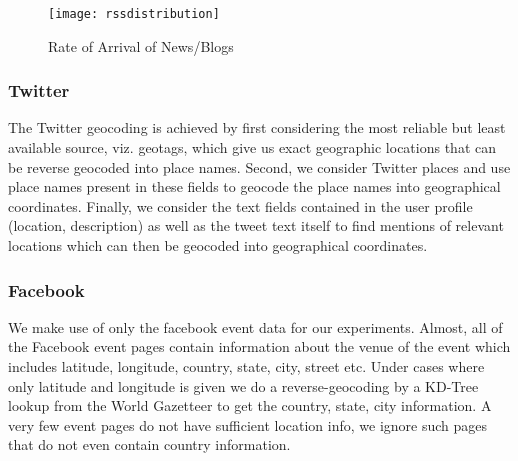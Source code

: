 \iffalse Most news articles and blog posts mention multiple locations, e.g.,
the location of reporting, the location of the incident, and locations corresponding
to the hometown of the newspaper. We developed a probabilistic reasoning
engine using probabilistic soft logic (PSL)
to infer the most likely city, state and country which is the main geographic focus the article.The PSL geocoder combines various types of evidence, such as named entities
such as locations, persons, and organizations identified by RLP, as
well as common names and aliases and populations of known
locations. These diverse types of evidence are used in weighted rules
that prioritize their influence on the PSL model's location
prediction. For example, extracted location tokens are strong
indicators of the content location of an article, while organization
and person names containing location names are weaker but still
informative signals; the rules corresponding to these evidence types
are weighted accordingly.

The methodology is similar to {\em Web-a-where: Geo-Tagging Web Content}.
\fi 

\begin{figure}
    \texttt{[image: rssdistribution]}
    \caption{Rate of Arrival of News/Blogs}
    \label{fig:rssdistribution}
\end{figure}

\subsubsection{Twitter}
The Twitter\cite{twitter} geocoding is achieved by first
considering the most reliable but least available source,
viz. geotags, which give us exact geographic locations that can be
reverse geocoded into place names.  Second, we consider Twitter places
and use place names present in these fields to geocode the place names
into geographical coordinates.  Finally, we consider the text fields
contained in the user profile (location, description) as well as the
tweet text itself to find mentions of relevant locations which can
then be geocoded into geographical coordinates.

\subsubsection{Facebook}
We make use of only the facebook event data for our experiments. Almost, all of the Facebook event pages contain information about the venue of the event which includes latitude, longitude, country, state, city, street etc. Under cases where only latitude and longitude is given we do a reverse-geocoding by a KD-Tree lookup\cite{kd-tree} from the World Gazetteer to get the country, state, city information. A very few event pages do not have sufficient location info, we ignore such pages that do not even contain country information.
